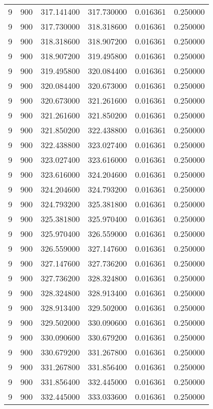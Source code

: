 \begin{longtable}{rrrrrr}
9 & 900 & 317.141400 & 317.730000 & 0.016361 & 0.250000 \\
9 & 900 & 317.730000 & 318.318600 & 0.016361 & 0.250000 \\
9 & 900 & 318.318600 & 318.907200 & 0.016361 & 0.250000 \\
9 & 900 & 318.907200 & 319.495800 & 0.016361 & 0.250000 \\
9 & 900 & 319.495800 & 320.084400 & 0.016361 & 0.250000 \\
9 & 900 & 320.084400 & 320.673000 & 0.016361 & 0.250000 \\
9 & 900 & 320.673000 & 321.261600 & 0.016361 & 0.250000 \\
9 & 900 & 321.261600 & 321.850200 & 0.016361 & 0.250000 \\
9 & 900 & 321.850200 & 322.438800 & 0.016361 & 0.250000 \\
9 & 900 & 322.438800 & 323.027400 & 0.016361 & 0.250000 \\
9 & 900 & 323.027400 & 323.616000 & 0.016361 & 0.250000 \\
9 & 900 & 323.616000 & 324.204600 & 0.016361 & 0.250000 \\
9 & 900 & 324.204600 & 324.793200 & 0.016361 & 0.250000 \\
9 & 900 & 324.793200 & 325.381800 & 0.016361 & 0.250000 \\
9 & 900 & 325.381800 & 325.970400 & 0.016361 & 0.250000 \\
9 & 900 & 325.970400 & 326.559000 & 0.016361 & 0.250000 \\
9 & 900 & 326.559000 & 327.147600 & 0.016361 & 0.250000 \\
9 & 900 & 327.147600 & 327.736200 & 0.016361 & 0.250000 \\
9 & 900 & 327.736200 & 328.324800 & 0.016361 & 0.250000 \\
9 & 900 & 328.324800 & 328.913400 & 0.016361 & 0.250000 \\
9 & 900 & 328.913400 & 329.502000 & 0.016361 & 0.250000 \\
9 & 900 & 329.502000 & 330.090600 & 0.016361 & 0.250000 \\
9 & 900 & 330.090600 & 330.679200 & 0.016361 & 0.250000 \\
9 & 900 & 330.679200 & 331.267800 & 0.016361 & 0.250000 \\
9 & 900 & 331.267800 & 331.856400 & 0.016361 & 0.250000 \\
9 & 900 & 331.856400 & 332.445000 & 0.016361 & 0.250000 \\
9 & 900 & 332.445000 & 333.033600 & 0.016361 & 0.250000 \\

\end{longtable}
